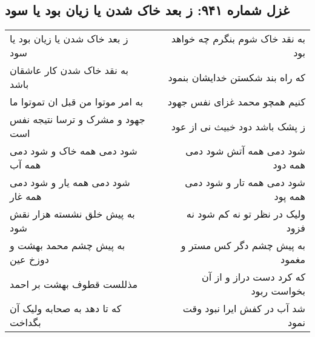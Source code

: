 \begin{center}
\section*{غزل شماره ۹۴۱: ز بعد خاک شدن یا زیان بود یا سود}
\label{sec:0941}
\begin{longtable}{l p{0.5cm} r}
ز بعد خاک شدن یا زیان بود یا سود
&&
به نقد خاک شوم بنگرم چه خواهد بود
\\
به نقد خاک شدن کار عاشقان باشد
&&
که راه بند شکستن خدایشان بنمود
\\
به امر موتوا من قبل ان تموتوا ما
&&
کنیم همچو محمد غزای نفس جهود
\\
جهود و مشرک و ترسا نتیجه نفس است
&&
ز پشک باشد دود خبیث نی از عود
\\
شود دمی همه خاک و شود دمی همه آب
&&
شود دمی همه آتش شود دمی همه دود
\\
شود دمی همه یار و شود دمی همه غار
&&
شود دمی همه تار و شود دمی همه پود
\\
به پیش خلق نشسته هزار نقش شود
&&
ولیک در نظر تو نه کم شود نه فزود
\\
به پیش چشم محمد بهشت و دوزخ عین
&&
به پیش چشم دگر کس مستر و مغمود
\\
مذللست قطوف بهشت بر احمد
&&
که کرد دست دراز و از آن بخواست ربود
\\
که تا دهد به صحابه ولیک آن بگداخت
&&
شد آب در کفش ایرا نبود وقت نمود
\\
\end{longtable}
\end{center}
